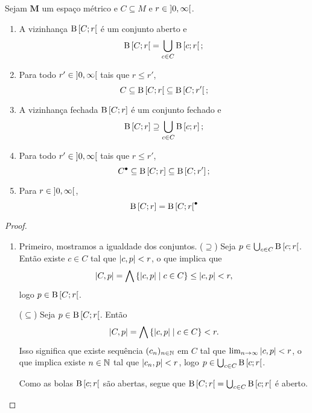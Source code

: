 \begin{exercise}
Sejam $\bm M$ um espaço métrico e $C \subseteq M$ e $r \in \left]{0},{\infty}\right[$.
	\begin{enumerate}
	\item A vizinhança $\mathrm{B}\left[{C};{r}\right[ $ é um conjunto aberto e
		\begin{equation*}
		\mathrm{B}\left[{C};{r}\right[ = \bigcup_{c \in C} \mathrm{B}\left[{c};{r}\right[;
		\end{equation*}
	\item  Para todo $r' \in \left]{0},{\infty}\right[$ tais que $r \leq r'$,
		\begin{equation*}
		C \subseteq \mathrm{B}\left[{C};{r}\right[ \subseteq \mathrm{B}\left[{C};{r'}\right[;
		\end{equation*}
	\item A vizinhança fechada $\mathrm{B}\left[{C};{r}\right] $ é um conjunto fechado e
		\begin{equation*}
		\mathrm{B}\left[{C};{r}\right] \supseteq \bigcup_{c \in C} \mathrm{B}\left[{c};{r}\right];
		\end{equation*}
	\item  Para todo $r' \in \left]{0},{\infty}\right[$ tais que $r \leq r'$,
		\begin{equation*}
		{C}^\bullet \subseteq \mathrm{B}\left[{C};{r}\right] \subseteq \mathrm{B}\left[{C};{r'}\right];
		\end{equation*}
	\item Para $r \in \left]{0},{\infty}\right[$,
		\begin{equation*}
		\mathrm{B}\left[{C};{r}\right] = {\mathrm{B}\left[{C};{r}\right[}^\bullet
		\end{equation*}
	\end{enumerate}
\end{exercise}
\begin{proof}
	\begin{enumerate}
	\item Primeiro, mostramos a igualdade dos conjuntos. ($\supseteq$) Seja $p \in \bigcup_{c \in C} \mathrm{B}\left[{c};{r}\right[$. Então existe $c \in C$ tal que $\left\vert{c},{p}\right\vert < r$, o que implica que
	\begin{equation*}
	\left\vert{C},{p}\right\vert = \bigwedge \left\{{\left\vert{c},{p}\right\vert}\;\middle\vert\;{c \in C}\right\} \leq \left\vert{c},{p}\right\vert < r,
	\end{equation*}
logo $p \in \mathrm{B}\left[{C};{r}\right[$.

($\subseteq$) Seja $p \in \mathrm{B}\left[{C};{r}\right[$. Então
	\begin{equation*}
	\left\vert{C},{p}\right\vert = \bigwedge \left\{{\left\vert{c},{p}\right\vert}\;\middle\vert\;{c \in C}\right\} < r.
	\end{equation*}
Isso significa que existe sequência $(c_n)_{n \in \mathbb{N}}$ em $C$ tal que $\lim_{n \rightarrow \infty} \left\vert{c},{p}\right\vert < r$, o que implica existe $n \in \mathbb{N}$ tal que $\left\vert{c_n},{p}\right\vert<r$, logo $p \in \bigcup_{c \in C} \mathrm{B}\left[{c};{r}\right[$.

Como as bolas $\mathrm{B}\left[{c};{r}\right[$ são abertas, segue que $\mathrm{B}\left[{C};{r}\right[ = \bigcup_{c \in C} \mathrm{B}\left[{c};{r}\right[$ é aberto.
	\end{enumerate}
\end{proof}

